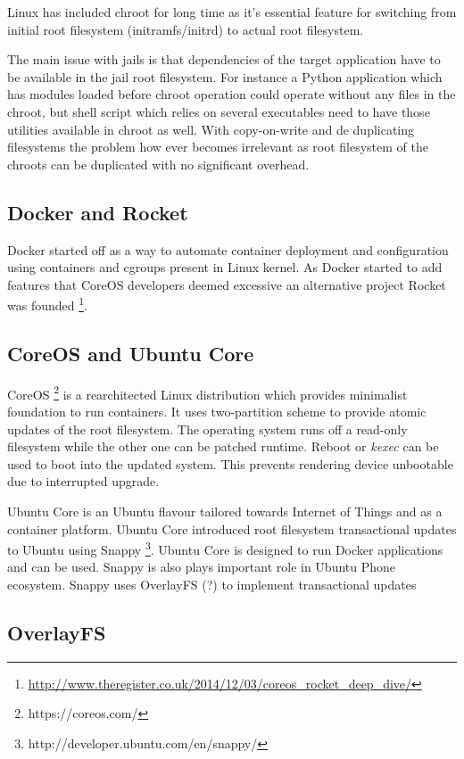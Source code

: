\documentclass{article}
\begin{document}
Linux has included chroot for long time as it's essential feature for switching from initial root filesystem (initramfs/initrd) to actual root filesystem.


The main issue with jails is that dependencies of the target application have
to be available in the jail root filesystem. For instance a Python application
which has modules loaded before chroot operation could operate without any
files in the chroot, but shell script which relies on several executables need
to have those utilities available in chroot as well. With copy-on-write and de
duplicating filesystems the problem how ever becomes irrelevant as root
filesystem of the chroots can be duplicated with no significant overhead.


\subsection{Docker and Rocket}

Docker started off as a way to automate container deployment and configuration
using containers and cgroups present in Linux kernel. As Docker started to add
features that CoreOS developers deemed excessive an alternative project Rocket
was founded
\footnote{\url{http://www.theregister.co.uk/2014/12/03/coreos_rocket_deep_dive/}}.

\subsection{CoreOS and Ubuntu Core}

CoreOS \footnote{https://coreos.com/} is a rearchitected Linux distribution
which provides minimalist foundation to run containers.
It uses two-partition scheme to provide atomic updates of the root filesystem.
The operating system runs off a read-only filesystem while the other one
can be patched runtime. Reboot or \emph{kexec} can be used to boot into
the updated system.
This prevents rendering device unbootable due to interrupted upgrade.

Ubuntu Core is an Ubuntu flavour tailored towards Internet of Things and as a
container platform.
Ubuntu Core introduced root filesystem transactional
updates to Ubuntu using Snappy
\footnote{http://developer.ubuntu.com/en/snappy/}.
Ubuntu Core is designed to run Docker applications and can be used.
Snappy is also plays important role in Ubuntu Phone ecosystem.
Snappy uses OverlayFS (?) to implement transactional updates 


\subsection{OverlayFS}
\end{document}
